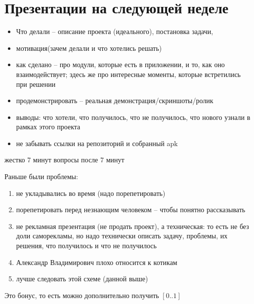 \section{Презентации на следующей неделе}
\begin{itemize}
\item
Что делали -- описание проекта (идеального), постановка задачи, 
\item
мотивация(зачем делали и что хотелись решать)
\item
как сделано -- про модули, которые есть в приложении, и то, как оно взаимодействует; здесь же про интересные моменты, 
которые встретились при решении
\item
продемонстрировать -- реальная демонстрация/скриншоты/ролик
\item
выводы: что хотели, что получилось, что не получилось, что нового узнали в рамках этого проекта
\item
не забывать ссылки на репозиторий и собранный apk
\end{itemize}

жестко 7 минут
вопросы после 7 минут

Раньше были проблемы:
\begin{enumerate}
\item
не укладывались во время (надо порепетировать)
\item
порепетировать перед незнающим человеком -- чтобы понятно рассказывать
\item
не рекламная презентация (не продать проект), а техническая: 
то есть не без доли саморекламы, но надо технически описать задачу, проблемы, их решения, что получилось и что не получилось
\item
Александр Владимирович плохо относится к котикам %
\item
лучше следовать этой схеме (данной выше)
\end{enumerate}

Это бонус, то есть можно дополнительно получить $[0 .. 1]$


